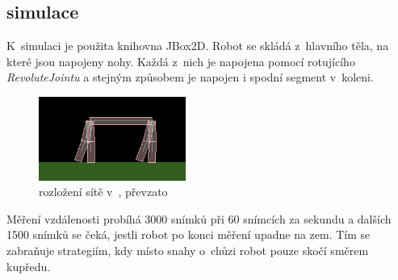 \documentclass[a4]{article}
\begin{document}
\subsection{simulace}
K~simulaci je použita knihovna JBox2D\cite{jbox2D}. Robot se skládá z~hlavního těla, na které jsou napojeny nohy. Každá z~nich je napojena pomocí rotujícího \emph{RevoluteJointu} a stejným způsobem je napojen i spodní segment v~koleni.\par

\begin{figure}
  \begin{center}
    \includegraphics[width=0.43\textwidth]{robot}
  \end{center}
  \caption{rozložení sítě v~\cite{clunegait}, převzato \cite{clunegait}}
\end{figure}

Měření vzdálenosti probíhá 3000 snímků při 60 snímcích za sekundu a dalších 1500 snímků se čeká, jestli robot po konci měření upadne na zem. Tím se zabraňuje strategiím, kdy místo snahy o~chůzi robot pouze skočí směrem kupředu.\par
\end{document}
